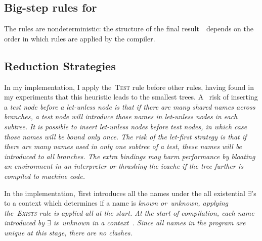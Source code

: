 \documentclass[article,screen,12pt, nonacm]{acmart}
\begin{document}

      \subsection{Big-step rules for \Compile}

      \begingroup
      \scriptsize
      \compiler
      \endgroup


      The rules are nondeterministic: the structure of the final result~\expr\
      depends on the order in which rules are applied by the compiler.  

      \subsection{Reduction Strategies}

      In my implementation, I apply the~\textsc{Test} rule before other rules,
      having found in my experiments that this heuristic leads to the smallest trees. A~%
      risk of inserting a \it{test} node before a \it{let-unless} node is that
      if there are many shared names across branches, a \it{test} node
      will introduce those names in \it{let-unless} nodes in each
      subtree.
      It is possible to insert \it{let-unless} nodes before \it{test}
      nodes, in which case those names will be bound
      only once.  The risk of the \it{let}-first strategy
      is that if there are many names used in only one subtree of a \it{test},
      these names will be introduced to \it{all} branches.  The extra
      bindings may harm
      performance by bloating an environment in an interpreter or thrashing the
      icache if the tree further is compiled to machine code. 

      In the implementation,~\DTran\~first introduces all the names under the
      all existential $\exists$'s to a context which determines if a name is
      \it{known} or~\it{unknown}, applying the~\textsc{Exists} rule is applied
      all at the start. At the start of compilation, each name introduced by
      $\exists$ is~\it{unknown} in a context~\ctx. Since all names in the
      program are unique at this stage, there are no clashes. 
\end{document}
